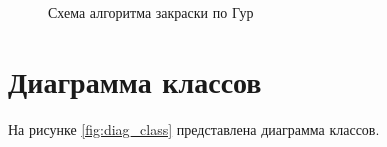 \begin{figure}[ph!]
	\caption{Схема алгоритма закраски по Гур}
	\label{fig:guro_alg}
\end{figure}

\clearpage

\section{Диаграмма классов}

На рисунке \ref{fig:diag_class} представлена диаграмма классов.


